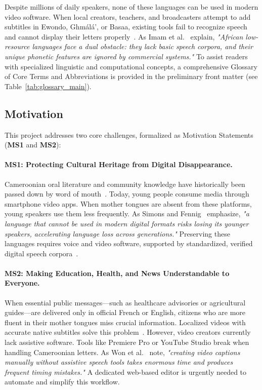 \documentclass[a4paper,11pt]{article}
\begin{document}
Despite millions of daily speakers, none of these languages can be used in modern video software. When local creators, teachers, and broadcasters attempt to add subtitles in Ewondo, Gh\textopeno m\'al\'a', or Basaa, existing tools fail to recognize speech and cannot display their letters properly~\cite{hedren2022challenges, imam2025automatic}. As Imam et al.~\cite{imam2025automatic} explain, \textit{"African low-resource languages face a dual obstacle: they lack basic speech corpora, and their unique phonetic features are ignored by commercial systems."} To assist readers with specialized linguistic and computational concepts, a comprehensive Glossary of Core Terms and Abbreviations is provided in the preliminary front matter (see Table~\ref{tab:glossary_main}).

\subsection{Motivation}
\label{sec:intro:motivation}

This project addresses two core challenges, formalized as Motivation Statements (\textbf{MS1} and \textbf{MS2}):

\paragraph{\textbf{MS1: Protecting Cultural Heritage from Digital Disappearance.}}
Cameroonian oral literature and community knowledge have historically been passed down by word of mouth~\cite{grenoble2010language}. Today, young people consume media through smartphone video apps. When mother tongues are absent from these platforms, young speakers use them less frequently. As Simons and Fennig~\cite{simons2020building} emphasize, \textit{"a language that cannot be used in modern digital formats risks losing its younger speakers, accelerating language loss across generations."} Preserving these languages requires voice and video software, supported by standardized, verified digital speech corpora~\cite{adelani2022masakhaner}.

\paragraph{\textbf{MS2: Making Education, Health, and News Understandable to Everyone.}}
When essential public messages—such as healthcare advisories or agricultural guides—are delivered only in official French or English, citizens who are more fluent in their mother tongues miss crucial information. Localized videos with accurate native subtitles solve this problem~\cite{bigioi2023multilingual}. However, video creators currently lack assistive software. Tools like Premiere Pro or YouTube Studio break when handling Cameroonian letters. As Won et al.~\cite{won2025endtoend} note, \textit{"creating video captions manually without assistive speech tools takes enormous time and produces frequent timing mistakes."} A dedicated web-based editor is urgently needed to automate and simplify this workflow.
\end{document}
